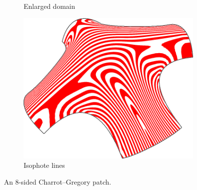 \documentclass[9pt,academicons]{article}
\begin{document}
\begin{figure}
\begin{subfigure}{.3\textwidth}
    \caption{Enlarged domain}
    \label{fig:8sided-enlarged}
  \end{subfigure}
  \hfill
  \begin{subfigure}{.3\textwidth}
    \centering
    \includegraphics[width=.883\textwidth]{images/8sided-3.png}
    \caption{Isophote lines}
    \label{fig:8sided-iso}
  \end{subfigure}
  \caption{An 8-sided Charrot--Gregory patch.}
  \label{fig:8sided}
\end{figure}
\end{document}
